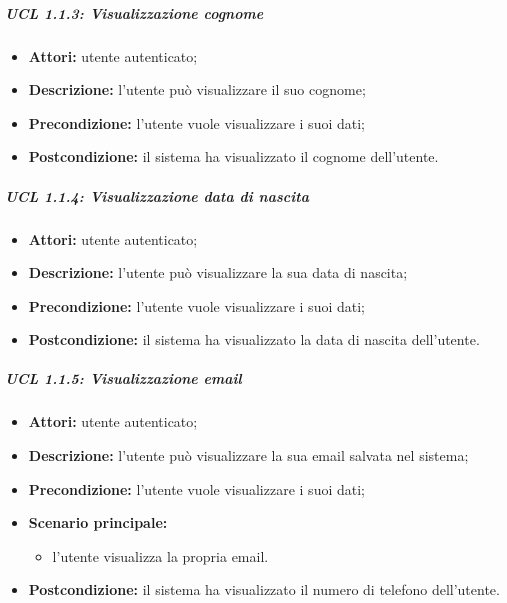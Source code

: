 \subparagraph{UCL 1.1.3: Visualizzazione cognome}
\begin{itemize}
	\item \textbf{Attori:} utente autenticato;
	\item \textbf{Descrizione:} l'utente può visualizzare il suo cognome;
	\item \textbf{Precondizione:} l'utente vuole visualizzare i suoi dati;
	\item \textbf{Postcondizione:} il sistema ha visualizzato il cognome dell'utente.
\end{itemize}

\subparagraph{UCL 1.1.4: Visualizzazione data di nascita}
\begin{itemize}
	\item \textbf{Attori:} utente autenticato;
	\item \textbf{Descrizione:} l'utente può visualizzare la sua data di nascita;
	\item \textbf{Precondizione:} l'utente vuole visualizzare i suoi dati;
	\item \textbf{Postcondizione:} il sistema ha visualizzato la data di nascita dell'utente.
\end{itemize}

\iffalse %
\subparagraph{UCL 1.1.5: Visualizzazione numero di telefono}
\begin{itemize}
	\item \textbf{Attori:} utente autenticato;
	\item \textbf{Descrizione:} l'utente può visualizzare il numero di telefono salvato nel sistema;
	\item \textbf{Precondizione:} l'utente vuole visualizzare i suoi dati;
	\item \textbf{Scenario principale:}
	\begin{itemize}
	 \item l'utente visualizza il proprio numero di telefono.
	\end{itemize}
	\item \textbf{Postcondizione:} il sistema ha visualizzato il numero di telefono dell'utente.
\end{itemize}
\fi

\subparagraph{UCL 1.1.5: Visualizzazione email}
\begin{itemize}
	\item \textbf{Attori:} utente autenticato;
	\item \textbf{Descrizione:} l'utente può visualizzare la sua email salvata nel sistema;
	\item \textbf{Precondizione:} l'utente vuole visualizzare i suoi dati;
	\item \textbf{Scenario principale:}
	\begin{itemize}
	 \item l'utente visualizza la propria email.
	\end{itemize}
	\item \textbf{Postcondizione:} il sistema ha visualizzato il numero di telefono dell'utente.
\end{itemize}


